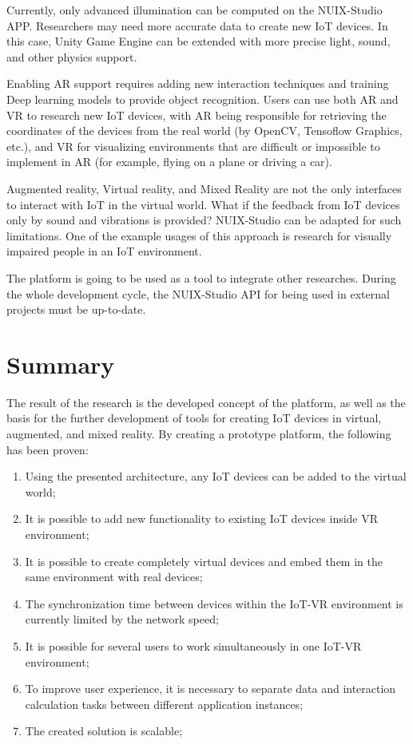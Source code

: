 Currently, only advanced illumination can be computed on the NUIX-Studio APP. Researchers may need more accurate data to create new IoT devices. In this case, Unity Game Engine can be extended with more precise light, sound, and other physics support.

Enabling AR support requires adding new interaction techniques and training Deep learning models to provide object recognition. Users can use both AR and VR to research new IoT devices, with AR being responsible for retrieving the coordinates of the devices from the real world (by OpenCV, Tensoflow Graphics, etc.), and VR for visualizing environments that are difficult or impossible to implement in AR (for example, flying on a plane or driving a car).

Augmented reality, Virtual reality, and Mixed Reality are not the only interfaces to interact with IoT in the virtual world. What if the feedback from IoT devices only by sound and vibrations is provided? NUIX-Studio can be adapted for such limitations. One of the example usages of this approach is research for visually impaired people in an IoT environment.

The platform is going to be used as a tool to integrate other researches. During the whole development cycle, the NUIX-Studio API for being used in external projects must be up-to-date. 

\section{Summary}

The result of the research is the developed concept of the platform, as well as the basis for the further development of tools for creating IoT devices in virtual, augmented, and mixed reality. By creating a prototype platform, the following has been proven:
\begin{enumerate}
    \item Using the presented architecture, any IoT devices can be added to the virtual world;
    \item It is possible to add new functionality to existing IoT devices inside VR environment;
    \item It is possible to create completely virtual devices and embed them in the same environment with real devices;
    \item The synchronization time between devices within the IoT-VR environment is currently limited by the network speed;
    \item It is possible for several users to work simultaneously in one IoT-VR environment;
    \item To improve user experience, it is necessary to separate data and interaction calculation tasks between different application instances;
    \item The created solution is scalable;
\end{enumerate}


